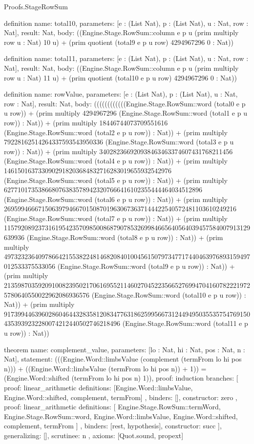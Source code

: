 \begin{lexlean}{Proofs.StageRowSum}
\begin{semanticmodule}
definition{
  name: total10,
  parameters: [e : (List Nat), p : (List Nat), u : Nat, row : Nat],
  result: Nat,
  body: ((Engine.Stage.RowSum::column e p u (prim multiply row u : Nat) 10 u) + (prim quotient (total9 e p u row) 4294967296 0 : Nat))
}

definition{
  name: total11,
  parameters: [e : (List Nat), p : (List Nat), u : Nat, row : Nat],
  result: Nat,
  body: ((Engine.Stage.RowSum::column e p u (prim multiply row u : Nat) 11 u) + (prim quotient (total10 e p u row) 4294967296 0 : Nat))
}

definition{
  name: rowValue,
  parameters: [e : (List Nat), p : (List Nat), u : Nat, row : Nat],
  result: Nat,
  body: ((((((((((((Engine.Stage.RowSum::word (total0 e p u row)) + (prim multiply 4294967296 (Engine.Stage.RowSum::word (total1 e p u row)) : Nat)) + (prim multiply 18446744073709551616 (Engine.Stage.RowSum::word (total2 e p u row)) : Nat)) + (prim multiply 79228162514264337593543950336 (Engine.Stage.RowSum::word (total3 e p u row)) : Nat)) + (prim multiply 340282366920938463463374607431768211456 (Engine.Stage.RowSum::word (total4 e p u row)) : Nat)) + (prim multiply 1461501637330902918203684832716283019655932542976 (Engine.Stage.RowSum::word (total5 e p u row)) : Nat)) + (prim multiply 6277101735386680763835789423207666416102355444464034512896 (Engine.Stage.RowSum::word (total6 e p u row)) : Nat)) + (prim multiply 26959946667150639794667015087019630673637144422540572481103610249216 (Engine.Stage.RowSum::word (total7 e p u row)) : Nat)) + (prim multiply 115792089237316195423570985008687907853269984665640564039457584007913129639936 (Engine.Stage.RowSum::word (total8 e p u row)) : Nat)) + (prim multiply 497323236409786642155382248146820840100456150797347717440463976893159497012533375533056 (Engine.Stage.RowSum::word (total9 e p u row)) : Nat)) + (prim multiply 2135987035920910082395021706169552114602704522356652769947041607822219725780640550022962086936576 (Engine.Stage.RowSum::word (total10 e p u row)) : Nat)) + (prim multiply 9173994463960286046443283581208347763186259956673124494950355357547691504353939232280074212440502746218496 (Engine.Stage.RowSum::word (total11 e p u row)) : Nat))
}

theorem{
  name: complement_value,
  parameters: [lo : Nat, hi : Nat, pos : Nat, n : Nat],
  statement: (((Engine.Word::limbsValue (complement (termFrom lo hi pos n))) + ((Engine.Word::limbsValue (termFrom lo hi pos n)) + 1)) = (Engine.Word::shifted (termFrom lo hi pos n) 1)),
  proof: induction{
    branches: [
      {
        proof: linear_arithmetic{
          definitions: [Engine.Word::limbsValue, Engine.Word::shifted, complement, termFrom]
        },
        binders: [],
        constructor: zero
      },
      {
        proof: linear_arithmetic{
          definitions: [
            Engine.Stage.RowSum::termWord,
            Engine.Stage.RowSum::word,
            Engine.Word::limbsValue,
            Engine.Word::shifted,
            complement,
            termFrom
          ]
        },
        binders: [rest, hypothesis],
        constructor: succ
      }
    ],
    generalizing: [],
    scrutinee: n
  },
  axioms: [Quot.sound, propext]
}


\end{semanticmodule}
\end{lexlean}
